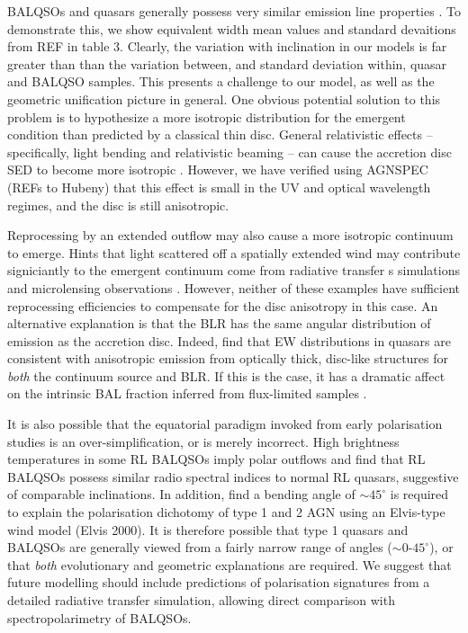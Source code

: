 \documentclass[useAMS,usenatbib]{mn2e_x}
\begin{document}
BALQSOs and quasars generally possess very similar emission line properties 
\citep[e.g.][]{weymann1991,reichard2003}. To demonstrate this, we show equivalent width
mean values and standard devaitions from REF in table 3. Clearly, the variation
with inclination in our models is far greater than than the variation 
between, and standard deviation within, quasar and BALQSO samples.  
This presents a challenge to our model, as well as the geometric unification picture in general.
One obvious potential solution to this problem is to hypothesize a more isotropic distribution 
for the emergent condition than predicted by a classical thin disc. 
General relativistic effects -- specifically, light bending
and relativistic beaming -- can cause 
the accretion disc SED to become more isotropic \citep[e.g.][]{zhang1997,munozdarias2013}. 
However, we have verified using AGNSPEC (REFs to Hubeny)
that this effect is small in the UV and optical wavelength regimes, 
and the disc is still anisotropic.

Reprocessing by an extended outflow may also cause a more isotropic
continuum to emerge. Hints that light scattered off a spatially extended 
wind may contribute signiciantly to the emergent continuum come from radiative transfer s
simulations \citep{simproga2012} and microlensing observations \citep{sluse2015}.
However, neither of these examples have sufficient reprocessing efficiencies to 
compensate for the disc anisotropy in this case.
An alternative explanation is that the BLR has the same angular distribution 
of emission as the accretion disc.
Indeed, \cite{risaliti2011} find that EW distributions in quasars are consistent with anisotropic emission 
from optically thick, disc-like structures for {\em both} the continuum source and BLR. 
If this is the case, it has a dramatic affect on the intrinsic
BAL fraction inferred from flux-limited samples \citep{goodrich1997,krolikvoit1998}. 

It is also possible that the equatorial paradigm invoked from early polarisation
studies \citep{goodrich1995, cohen1995,brotherton2006} is an over-simplification, or is merely incorrect. 
High brightness temperatures in some RL BALQSOs imply polar outflows \citep{zhou2006} 
and \cite{bruni2012} find that
RL BALQSOs possess similar radio spectral indices to normal RL quasars, 
suggestive of comparable inclinations. 
In addition, \cite{marin2013} find a bending angle of $\sim45^\circ$ is required to 
explain the polarisation dichotomy of type 1 and 2 AGN using an Elvis-type wind 
model (Elvis 2000). It is therefore possible 
that type 1 quasars and BALQSOs are generally viewed from a fairly narrow range of angles 
($\sim0$-$45^\circ$), or that {\em both} evolutionary and geometric explanations are required.
We suggest that future modelling should include predictions of polarisation signatures
from a detailed radiative transfer simulation, allowing direct comparison with spectropolarimetry
of BALQSOs. 
\end{document}
